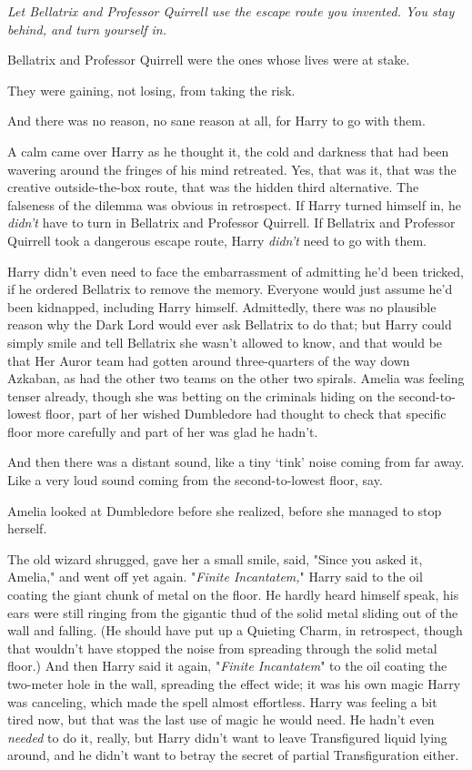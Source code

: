 \emph{Let Bellatrix and Professor Quirrell use the escape route you invented.
You stay behind, and turn yourself in.}

Bellatrix and Professor Quirrell were the ones whose lives were at stake.

They were gaining, not losing, from taking the risk.

And there was no reason, no sane reason at all, for Harry to go with them.

A calm came over Harry as he thought it, the cold and darkness that had been
wavering around the fringes of his mind retreated. Yes, that was it, that was
the creative outside-the-box route, that was the hidden third alternative. The
falseness of the dilemma was obvious in retrospect. If Harry turned himself in,
he \emph{didn't} have to turn in Bellatrix and Professor Quirrell. If Bellatrix
and Professor Quirrell took a dangerous escape route, Harry \emph{didn't} need
to go with them.

Harry didn't even need to face the embarrassment of admitting he'd been
tricked, if he ordered Bellatrix to remove the memory. Everyone would just
assume he'd been kidnapped, including Harry himself. Admittedly, there was no
plausible reason why the Dark Lord would ever ask Bellatrix to do that; but
Harry could simply smile and tell Bellatrix she wasn't allowed to know, and
that would be that{\el}
\sbreak
Her Auror team had gotten around three-quarters of the way down Azkaban, as had
the other two teams on the other two spirals. Amelia was feeling tenser
already, though she was betting on the criminals hiding on the second-to-lowest
floor, part of her wished Dumbledore had thought to check that specific floor
more carefully and part of her was glad he hadn't.

And then there was a distant sound, like a tiny `tink' noise coming from far
away. Like a very loud sound coming from the second-to-lowest floor, say.

Amelia looked at Dumbledore before she realized, before she managed to stop
herself.

The old wizard shrugged, gave her a small smile, said, "Since you asked it,
Amelia," and went off yet again.
\sbreak
"\emph{Finite Incantatem,}" Harry said to the oil coating the giant chunk of
metal on the floor. He hardly heard himself speak, his ears were still ringing
from the gigantic thud of the solid metal sliding out of the wall and falling.
(He should have put up a Quieting Charm, in retrospect, though that wouldn't
have stopped the noise from spreading through the solid metal floor.) And then
Harry said it again, "\emph{Finite Incantatem}" to the oil coating the
two-meter hole in the wall, spreading the effect wide; it was his own magic
Harry was canceling, which made the spell almost effortless. Harry was feeling
a bit tired now, but that was the last use of magic he would need. He hadn't
even \emph{needed} to do it, really, but Harry didn't want to leave
Transfigured liquid lying around, and he didn't want to betray the secret of
partial Transfiguration either.

